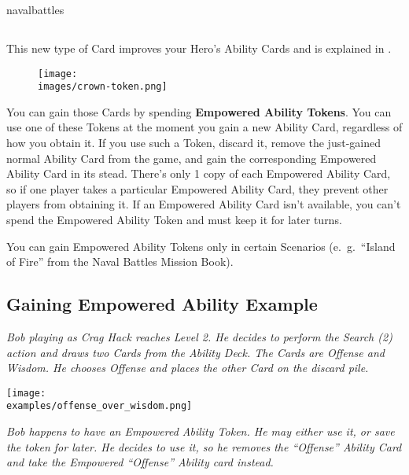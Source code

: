 \begin{expansion}{navalbattles}
\begin{multicols*}{2}
  \subsection*{}
  This new type of Card improves your Hero's Ability Cards and is explained in .

  \setlength\intextsep{0pt}
  \setlength\columnsep{1em}
  \begin{wrapfigure}{r}{0.2\linewidth}
    \texttt{[image: \\images/crown-token.png]}
  \end{wrapfigure}
  You can gain those Cards by spending \textbf{Empowered Ability Tokens}.
  You can use one of these Tokens at the moment you gain a new Ability Card, regardless of how you obtain it.
  If you use such a Token, discard it, remove the just-gained normal Ability Card from the game, and gain the corresponding Empowered Ability Card in its stead.
  There's only 1 copy of each Empowered Ability Card, so if one player takes a particular Empowered Ability Card, they prevent other players from obtaining it.
  If an Empowered Ability Card isn't available, you can't spend the Empowered Ability Token and must keep it for later turns.
  \vspace*{1em}

  You can gain Empowered Ability Tokens only in certain Scenarios (e.~g.~``Island of Fire'' from the Naval Battles Mission Book).\\

  \subsection*{Gaining Empowered Ability Example}
  \textit{Bob playing as Crag Hack reaches Level 2.
    He decides to perform the Search (2) action and draws two Cards from the Ability Deck.
    The Cards are Offense and Wisdom.
    He chooses Offense and places the other Card on the discard pile.}

  \begin{center}
    \texttt{[image: \\examples/offense\_over\_wisdom.png]}
  \end{center}

  \textit{Bob happens to have an Empowered Ability Token.
    He may either use it, or save the token for later.
    He decides to use it, so he removes the ``Offense'' Ability Card and take the Empowered ``Offense'' Ability card instead.}


\end{multicols*}
\end{expansion}
